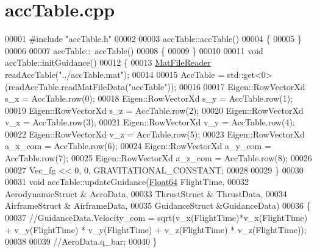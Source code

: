 \hypertarget{acc_table_8cpp_source}{}\section{acc\+Table.\+cpp}
\label{acc_table_8cpp_source}

\begin{DoxyCode}
00001 \textcolor{preprocessor}{#include "accTable.h"}
00002 
00003 accTable::accTable()
00004 \{
00005 \}
00006 
00007 accTable::~accTable()
00008 \{
00009 \}
00010 
00011 \textcolor{keywordtype}{void} accTable::initGuidance()
00012 \{
00013     \hyperlink{class_mat_file_reader}{MatFileReader} readAccTable(\textcolor{stringliteral}{"../accTable.mat"});
00014 
00015     AccTable = std::get<0>(readAccTable.readMatFileData(\textcolor{stringliteral}{"accTable"}));
00016 
00017         Eigen::RowVectorXd s\_x     = AccTable.row(0);
00018         Eigen::RowVectorXd s\_y     = AccTable.row(1);
00019         Eigen::RowVectorXd s\_z     = AccTable.row(2);
00020         Eigen::RowVectorXd v\_x     = AccTable.row(3);
00021         Eigen::RowVectorXd v\_y     = AccTable.row(4);
00022         Eigen::RowVectorXd v\_z     = AccTable.row(5);
00023         Eigen::RowVectorXd a\_x\_com = AccTable.row(6);
00024         Eigen::RowVectorXd a\_y\_com = AccTable.row(7);
00025         Eigen::RowVectorXd a\_z\_com = AccTable.row(8);
00026         
00027         Vec\_fg << 0, 0, GRAVITATIONAL\_CONSTANT;
00028 
00029 \}
00030 
00031 \textcolor{keywordtype}{void} accTable::updateGuidance(\hyperlink{group___tools_ga3f1431cb9f76da10f59246d1d743dc2c}{Float64} FlightTime, 
00032                             AerodynamicStruct & AeroData, 
00033                             ThrustStruct & ThrustData, 
00034                             AirframeStruct & AirframeData, 
00035                             GuidanceStruct &GuidanceData)
00036 \{
00037     \textcolor{comment}{//GuidanceData.Velocity\_com = sqrt(v\_x(FlightTime)*v\_x(FlightTime) + v\_y(FlightTime) * v\_y(FlightTime)
       + v\_z(FlightTime) * v\_z(FlightTime));}
00038 
00039     \textcolor{comment}{//AeroData.q\_bar;}
00040 \}
\end{DoxyCode}
